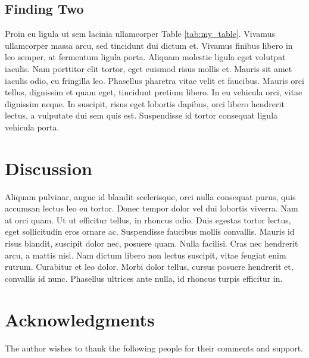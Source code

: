 \documentclass[12pt,letterpaper]{article} %
\begin{document}
\subsection*{Finding Two}
Proin eu ligula ut sem lacinia ullamcorper Table \ref{tab:my_table}. Vivamus ullamcorper massa arcu, sed tincidunt dui dictum et. Vivamus finibus libero in leo semper, at fermentum ligula porta. Aliquam molestie ligula eget volutpat iaculis. Nam porttitor elit tortor, eget euismod risus mollis et. Mauris sit amet iaculis odio, eu fringilla leo. Phasellus pharetra vitae velit et faucibus. Mauris orci tellus, dignissim et quam eget, tincidunt pretium libero. In eu vehicula orci, vitae dignissim neque. In suscipit, risus eget lobortis dapibus, orci libero hendrerit lectus, a vulputate dui sem quis est. Suspendisse id tortor consequat ligula vehicula porta.

\section*{Discussion}

Aliquam pulvinar, augue id blandit scelerisque, orci nulla consequat purus, quis accumsan lectus leo eu tortor. Donec tempor dolor vel dui lobortis viverra. Nam at orci quam. Ut ut efficitur tellus, in rhoncus odio. Duis egestas tortor lectus, eget sollicitudin eros ornare ac. Suspendisse faucibus mollis convallis. Mauris id risus blandit, suscipit dolor nec, posuere quam. Nulla facilisi. Cras nec hendrerit arcu, a mattis nisl. Nam dictum libero non lectus suscipit, vitae feugiat enim rutrum. Curabitur et leo dolor. Morbi dolor tellus, cursus posuere hendrerit et, convallis id nunc. Phasellus ultrices ante nulla, id rhoncus turpis efficitur in.

\section*{Acknowledgments}

The author wishes to thank the following people for their comments and support.


\setlength{\bibsep}{0.00cm plus 0.05cm} %


\end{document}
